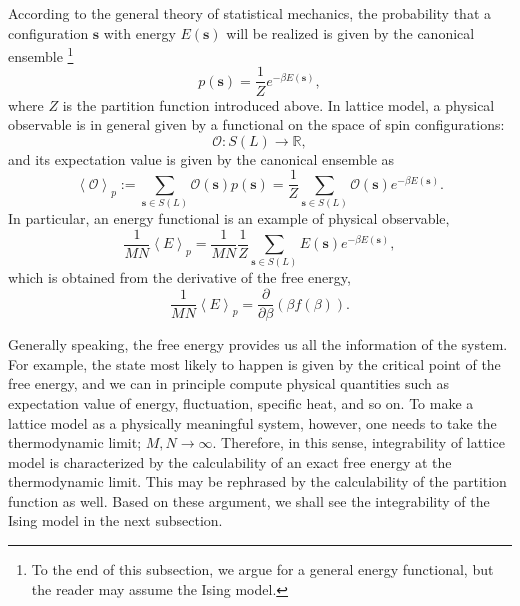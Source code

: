 According to the general theory of statistical mechanics, the probability
that a configuration $\mathbf{s}$ with energy $E\left(\mathbf{s}\right)$
will be realized is given by the canonical ensemble%
%
\footnote{To the end of this subsection, we argue for a general energy functional,
but the reader may assume the Ising model. }
%
\begin{equation}
p\left(\mathbf{s}\right)  =  \frac{1}{Z}e^{-\beta E\left(\mathbf{s}\right)},
\end{equation}
 where $Z$ is the partition function introduced above. In lattice
model, a physical observable is in general given by a functional on
the space of spin configurations: 
\begin{equation}
  \mathcal{O}  :  S\left(L\right)  \longrightarrow  \mathbb{R},
\end{equation}
and its expectation value is given by the canonical ensemble as 
\begin{equation}
\left\langle \mathcal{O}\right\rangle _{p}  
  :=\sum_{\mathbf{s}\in S\left(L\right)}\mathcal{O}\left(\mathbf{s}\right)p\left(\mathbf{s}\right)  
    =\frac{1}{Z}\sum_{\mathbf{s}\in S\left(L\right)}\mathcal{O}\left(\mathbf{s}\right)e^{-\beta E\left(\mathbf{s}\right)}.
\end{equation}
 In particular, an energy functional is an example of physical observable,
\begin{equation}
\frac{1}{MN}\left\langle E\right\rangle _{p}
  =\frac{1}{MN}\frac{1}{Z}\sum_{\mathbf{s}\in S\left(L\right)}E\left(\mathbf{s}\right)e^{-\beta E\left(\mathbf{s}\right)},
\end{equation}
 which is obtained from the derivative of the free energy, 
\begin{equation}
\frac{1}{MN}\left\langle E\right\rangle _{p}=\frac{\partial}{\partial\beta}\left(\beta f\left(\beta\right)\right).
\end{equation}

Generally speaking, the free energy provides us all the information
of the system. For example, the state most likely to happen is given
by the critical point of the free energy, and we can in principle
compute physical quantities such as expectation value of energy, fluctuation,
specific heat, and so on. To make a lattice model as a physically
meaningful system, however, one needs to take the thermodynamic limit;
$M,N\rightarrow\infty$. Therefore, in this sense, integrability of
lattice model is characterized by the calculability of an exact free
energy at the thermodynamic limit. This may be rephrased by the calculability
of the partition function as well. Based on these argument, we shall
see the integrability of the Ising model in the next subsection. 





